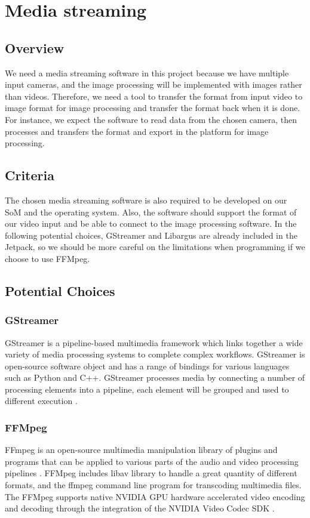 \documentclass[letterpaper,10pt,serif,draftclsnofoot,onecolumn,compsoc,titlepage]{IEEEtran}
\begin{document}
\section{Media streaming}
\subsection{Overview}
We need a media streaming software in this project because we have multiple input cameras, and the image 
processing will be implemented with images rather than videos. Therefore, we need a tool to transfer the 
format from input video to image format for image processing and transfer the format back when it is done. 
For instance, we expect the software to read data from the chosen camera, then processes and transfers 
the format and export in the platform for image processing.\\

\subsection{Criteria}
The chosen media streaming software is also required to be developed on our SoM and the operating 
system. Also, the software should support the format of our video input and be able to connect to 
the image processing software. In the following potential choices, GStreamer and Libargus are 
already included in the Jetpack, so we should be more careful on the limitations when programming 
if we choose to use FFMpeg. \\

\subsection{Potential Choices}
\subsubsection{GStreamer}
GStreamer is a pipeline-based multimedia framework which links together a wide variety of media processing systems to complete complex workflows. GStreamer is open-source software object and has
 a range of bindings for various languages such as Python and C++. GStreamer processes media
  by connecting a number of processing elements into a pipeline, each element will be grouped and 
  used to different execution \cite{gstreamer}.\\

\subsubsection{FFMpeg}
FFmpeg is an open-source multimedia manipulation library of plugins and programs that can be applied to 
various parts of the audio and video processing pipelines \cite{ffmpeg}. FFMpeg includes libav library 
to handle a great quantity of different formats, and the ffmpeg command line program for transcoding 
multimedia files. The FFMpeg supports native NVIDIA GPU hardware accelerated video encoding and decoding 
through the integration of the NVIDIA Video Codec SDK \cite{nvidia}.\\
\end{document}
